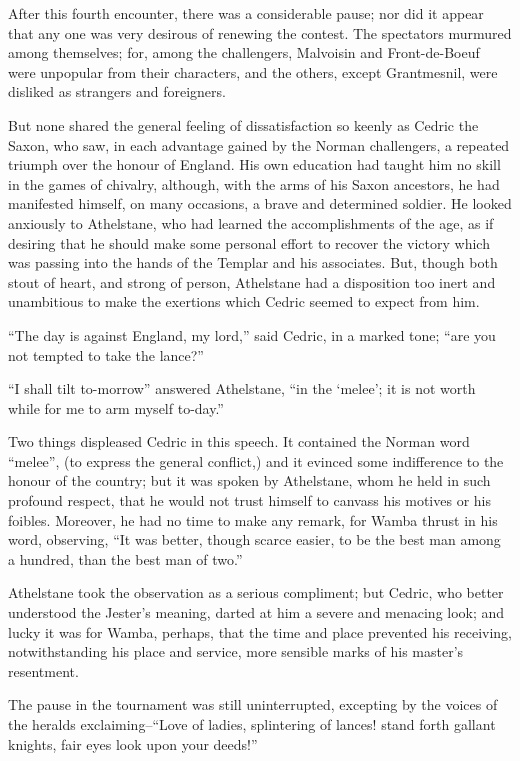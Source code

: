 After this fourth encounter, there was a considerable pause; nor did it
appear that any one was very desirous of renewing the contest. The
spectators murmured among themselves; for, among the challengers,
Malvoisin and Front-de-Boeuf were unpopular from their characters, and
the others, except Grantmesnil, were disliked as strangers and
foreigners.

But none shared the general feeling of dissatisfaction so keenly as
Cedric the Saxon, who saw, in each advantage gained by the Norman
challengers, a repeated triumph over the honour of England. His own
education had taught him no skill in the games of chivalry, although,
with the arms of his Saxon ancestors, he had manifested himself, on many
occasions, a brave and determined soldier. He looked anxiously to
Athelstane, who had learned the accomplishments of the age, as if
desiring that he should make some personal effort to recover the victory
which was passing into the hands of the Templar and his associates. But,
though both stout of heart, and strong of person, Athelstane had a
disposition too inert and unambitious to make the exertions which Cedric
seemed to expect from him.

``The day is against England, my lord,'' said Cedric, in a marked tone;
``are you not tempted to take the lance?''

``I shall tilt to-morrow'' answered Athelstane, ``in the `melee'; it is
not worth while for me to arm myself to-day.''

Two things displeased Cedric in this speech. It contained the Norman
word ``melee'', (to express the general conflict,) and it evinced some
indifference to the honour of the country; but it was spoken by
Athelstane, whom he held in such profound respect, that he would not
trust himself to canvass his motives or his foibles. Moreover, he had no
time to make any remark, for Wamba thrust in his word, observing, ``It
was better, though scarce easier, to be the best man among a hundred,
than the best man of two.''

Athelstane took the observation as a serious compliment; but Cedric, who
better understood the Jester's meaning, darted at him a severe and
menacing look; and lucky it was for Wamba, perhaps, that the time and
place prevented his receiving, notwithstanding his place and service,
more sensible marks of his master's resentment.

The pause in the tournament was still uninterrupted, excepting by the
voices of the heralds exclaiming--``Love of ladies, splintering of
lances! stand forth gallant knights, fair eyes look upon your deeds!''

